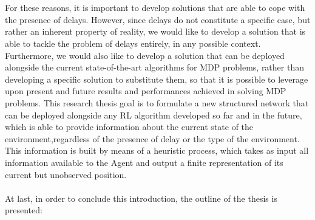     \\\\
    For these reasons, it is important to develop solutions that are able to cope with the presence of delays. However, since delays do not constitute a specific case, but rather an inherent property of reality, we would like to develop a solution that is able to tackle the problem of delays entirely, in any possible context. Furthermore, we would also like to develop a solution that can be deployed alongside the current state-of-the-art algorithms for MDP problems, rather than developing a specific solution to substitute them, so that it is possible to leverage upon present and future results and performances achieved in solving MDP problems. This research thesis goal is to formulate a new structured network that can be deployed alongside any RL algorithm developed so far and in the future, which is able to provide information about the current state of the environment,regardless of the presence of delay or the type of the environment. This information is built by means of a heuristic process, which takes as input all information available to the Agent and output a finite representation of its current but unobserved position.
    \\\\
    At last, in order to conclude this introduction, the outline of the thesis is presented:
